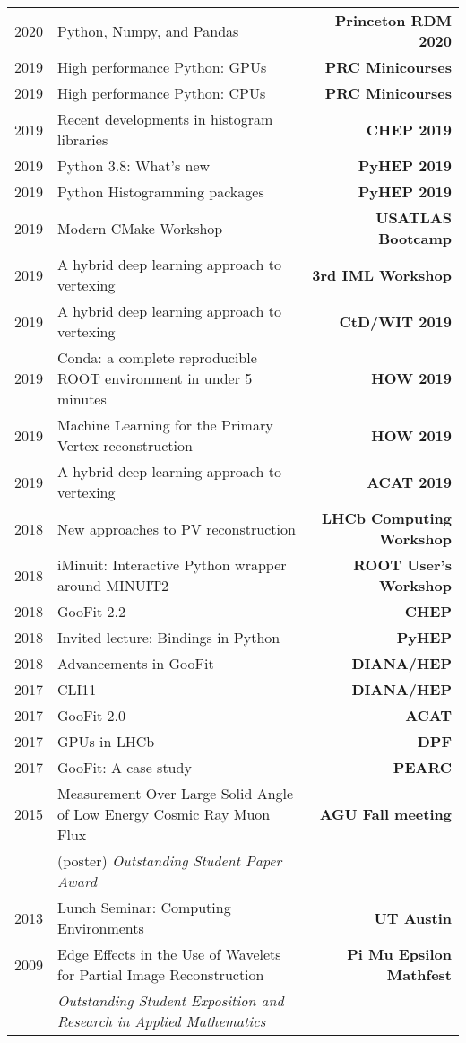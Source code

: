 \documentclass[10pt,letterpaper,english]{moderncv}
\begin{document}
\begin{tabularx}{\textwidth}{p{.35in}X>{\bfseries}r}
    2020 & Python, Numpy, and Pandas & Princeton RDM 2020\\ 	
    2019 & High performance Python: GPUs & PRC Minicourses \\ 	
    2019 & High performance Python: CPUs & PRC Minicourses \\ 	
    2019 & Recent developments in histogram libraries  & CHEP 2019 \\ 	
    2019 & Python 3.8: What's new & PyHEP 2019 \\ 	
    2019 & Python Histogramming packages & PyHEP 2019\\ 	
    2019 & Modern CMake Workshop & USATLAS Bootcamp \\ 	
    2019 & A hybrid deep learning approach to vertexing & 3rd IML Workshop \\ 	
    2019 & A hybrid deep learning approach to vertexing & CtD/WIT 2019 \\ 	
    2019 & Conda: a complete reproducible ROOT environment in under 5 minutes & HOW 2019 \\ 	
    2019 & Machine Learning for the Primary Vertex reconstruction & HOW 2019 \\ 	
    2019 & A hybrid deep learning approach to vertexing & ACAT 2019 \\ %
	2018 & New approaches to PV reconstruction & LHCb Computing Workshop \\ %
	2018 & iMinuit: Interactive Python wrapper around MINUIT2 & ROOT User's Workshop \\  %
	2018 & GooFit 2.2 & CHEP \\ %
	2018 & Invited lecture: Bindings in Python & PyHEP  \\
    2018 & Advancements in GooFit & DIANA/HEP \\
	2017 & CLI11 & DIANA/HEP \\
	2017 & GooFit 2.0 & ACAT \\
	2017 & GPUs in LHCb & DPF \\ %
	2017 & GooFit: A case study & PEARC \\
	
	
	2015 & Measurement Over Large Solid Angle of Low Energy Cosmic Ray Muon Flux &  AGU Fall meeting \\
	 & (poster) \emph{Outstanding Student Paper Award} & \\
	 2013 & Lunch Seminar: Computing Environments & UT Austin \\
	 2009 & Edge Effects in the Use of Wavelets for Partial Image Reconstruction & Pi Mu Epsilon Mathfest \\
	 & \emph{Outstanding Student Exposition and Research in Applied Mathematics} & \\
	 

\end{tabularx}
\end{document}
